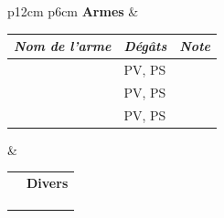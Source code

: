\documentclass[11pt,twoside,a4paper]{article}
\begin{document}
{\scriptsize %
\begin{tabular}[h]{ p{12cm} p{6cm} }
	\textbf{Armes} &  \\
	\begin{tabular}[h]{|p{5.0cm}|p{2.5cm}|p{4.5cm}|}
		\hline
			{\centering \emph{Nom de l'arme} }	&
			{\centering \emph{D{\'e}g{\^a}ts} }	&
			{\centering \emph{Note} }			\\
		\hline
			\dotfill & 
			\textcolor{grey25}{ \ovalbox{ \hfill } } PV, \textcolor{grey25}{ \ovalbox{ \hfill } } PS				& 
			\dotfill	\\
		\hline
			\dotfill	& 
			\textcolor{grey25}{ \ovalbox{ \hfill } } PV, \textcolor{grey25}{ \ovalbox{ \hfill } } PS				& 
			\dotfill	\\
		\hline
			\dotfill	& 
			\textcolor{grey25}{ \ovalbox{ \hfill } } PV, \textcolor{grey25}{ \ovalbox{ \hfill } } PS				& 
			\dotfill	\\
		\hline
	\end{tabular}
	& 
	\begin{tabular}[h]{ p{1.0cm}|p{5.0cm}|}
		\cline{2-2}
		 & \textbf{Divers}		\\
		\cline{2-2}
		 & \dotfill		\\
		\cline{2-2}
		 & \dotfill		\\
		\cline{2-2}
		 & \dotfill		\\
		\cline{2-2}
	\end{tabular}
	\\
\end{tabular} }
\end{document}
